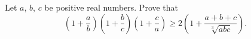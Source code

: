 Let $a$, $b$, $c$ be positive real numbers.  Prove that
\[ \left(1+\frac{a}{b}\right) \left(1+\frac{b}{c}\right) \left(1+\frac{c}{a}\right) \ge 2 \left(1+\frac{a+b+c}{\sqrt[3]{abc}}\right).  \]
